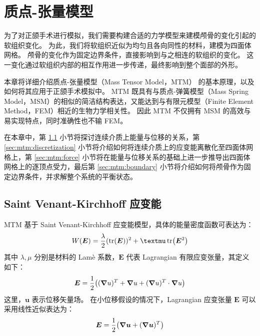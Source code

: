 
\chapter{质点-张量模型}
\label{cha:mtm}

为了对正颌手术进行模拟，我们需要构建合适的力学模型来建模颅骨的变化引起的软组织变化。
为此，我们将软组织近似为均匀且各向同性的材料，建模为四面体网格。
颅骨的变化作为固定边界条件，直接影响到与之相连的软组织的变化。
这一变化通过软组织内部的相互作用进一步传递，最终影响到整个面部的外形。

本章将详细介绍质点-张量模型（Mass Tensor Model，MTM）\cite{cotinHybridElasticModel2000} 的基本原理，以及如何将其应用于正颌手术模拟中。
MTM 既具有与质点-弹簧模型（Mass Spring Model，MSM）的相似的简洁结构表达，又能达到与有限元模型（Finite Element Method，FEM）相近的生物力学相关性\cite{mollemansPredictingSoftTissue2007}。
因此 MTM 不仅拥有 MSM 的高效与易实现特点，同时准确性也不输 FEM。

在本章中，第 \ref{sec:mtm:energy} 小节将探讨连续介质上能量与位移的关系，第 \ref{sec:mtm:discretization} 小节将介绍如何将连续介质上的应变能离散化至四面体网格上，第 \ref{sec:mtm:force} 小节将在能量与位移关系的基础上进一步推导出四面体网格上的逐顶点受力，最后第 \ref{sec:mtm:boundary} 小节将介绍如何将颅骨作为固定边界条件，并求解整个系统的平衡状态。

\section{Saint Venant-Kirchhoff 应变能}
\label{sec:mtm:energy}


MTM 基于 Saint Venant-Kirchhoff 应变能模型，具体的能量密度函数可表达为：
\begin{equation} \label{eq:mtm-energy}
  W(\bm{E}) = \frac{\lambda}{2} (\tr(\bm{E}))^2 + \mu \tr(\bm{E}^2)
\end{equation}
其中 $\lambda, \mu$ 分别是材料的 Lam\`e 系数，$\bm{E}$ 代表 Lagrangian 有限应变张量，其定义如下：
\begin{equation}
  \bm{E} = \frac{1}{2} \pqty{(\grad{u})^T + \grad{u} + (\grad{u})^T \cdot \grad{u}}
\end{equation}
这里，$\bm{u}$ 表示位移矢量场。
在小位移假设的情况下，Lagrangian 应变张量 $\bm{E}$ 可以采用线性近似表达为：
\begin{equation}
  \bm{E} = \frac{1}{2} \pqty{\grad{\bm{u}} + (\grad{\bm{u}})^T}
\end{equation}

